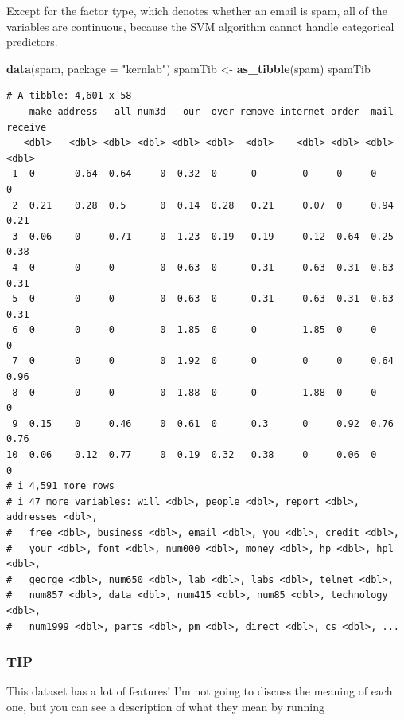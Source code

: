 \documentclass[
]{article}
\newenvironment{Shaded}{\begin{snugshade}}{\end{snugshade}}
\newcommand{\AttributeTok}[1]{\textcolor[rgb]{0.13,0.29,0.53}{#1}}
\newcommand{\FunctionTok}[1]{\textcolor[rgb]{0.13,0.29,0.53}{\textbf{#1}}}
\newcommand{\NormalTok}[1]{#1}
\newcommand{\OtherTok}[1]{\textcolor[rgb]{0.56,0.35,0.01}{#1}}
\newcommand{\StringTok}[1]{\textcolor[rgb]{0.31,0.60,0.02}{#1}}
\begin{document}
Except for the factor type, which denotes whether an email is spam, all
of the variables are continuous, because the SVM algorithm cannot handle
categorical predictors.

\begin{Shaded}
\begin{Highlighting}[]
\FunctionTok{data}\NormalTok{(spam, }\AttributeTok{package =} \StringTok{"kernlab"}\NormalTok{)}
\NormalTok{spamTib }\OtherTok{\textless{}{-}} \FunctionTok{as\_tibble}\NormalTok{(spam)}
\NormalTok{spamTib}
\end{Highlighting}
\end{Shaded}

\begin{verbatim}
# A tibble: 4,601 x 58
    make address   all num3d   our  over remove internet order  mail receive
   <dbl>   <dbl> <dbl> <dbl> <dbl> <dbl>  <dbl>    <dbl> <dbl> <dbl>   <dbl>
 1  0       0.64  0.64     0  0.32  0      0        0     0     0       0   
 2  0.21    0.28  0.5      0  0.14  0.28   0.21     0.07  0     0.94    0.21
 3  0.06    0     0.71     0  1.23  0.19   0.19     0.12  0.64  0.25    0.38
 4  0       0     0        0  0.63  0      0.31     0.63  0.31  0.63    0.31
 5  0       0     0        0  0.63  0      0.31     0.63  0.31  0.63    0.31
 6  0       0     0        0  1.85  0      0        1.85  0     0       0   
 7  0       0     0        0  1.92  0      0        0     0     0.64    0.96
 8  0       0     0        0  1.88  0      0        1.88  0     0       0   
 9  0.15    0     0.46     0  0.61  0      0.3      0     0.92  0.76    0.76
10  0.06    0.12  0.77     0  0.19  0.32   0.38     0     0.06  0       0   
# i 4,591 more rows
# i 47 more variables: will <dbl>, people <dbl>, report <dbl>, addresses <dbl>,
#   free <dbl>, business <dbl>, email <dbl>, you <dbl>, credit <dbl>,
#   your <dbl>, font <dbl>, num000 <dbl>, money <dbl>, hp <dbl>, hpl <dbl>,
#   george <dbl>, num650 <dbl>, lab <dbl>, labs <dbl>, telnet <dbl>,
#   num857 <dbl>, data <dbl>, num415 <dbl>, num85 <dbl>, technology <dbl>,
#   num1999 <dbl>, parts <dbl>, pm <dbl>, direct <dbl>, cs <dbl>, ...
\end{verbatim}

\subsubsection{TIP}\label{tip-2}

This dataset has a lot of features! I'm not going to discuss the meaning
of each one, but you can see a description of what they mean by running
\end{document}
